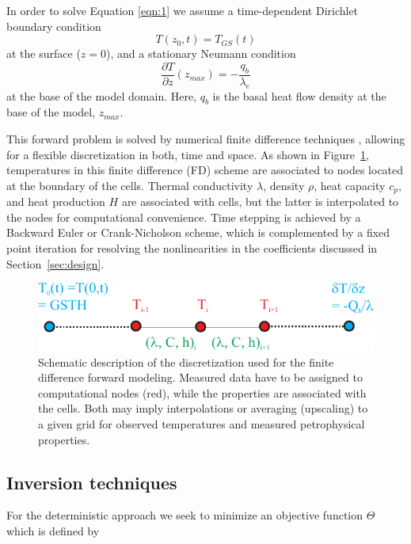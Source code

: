 \documentclass[cp]{copernicus}
\begin{document}
In order to solve Equation \ref{eqn:1} we assume a time-dependent Dirichlet boundary condition 
\begin{equation}\label{eqn:3a} 
T(z_0,t)=T_{GS}(t)
\end{equation} 
\noindent at the surface ($z=0$), and a stationary Neumann condition
\begin{equation}\label{eqn:3b}
\frac{\partial T}{\partial z}(z_{max }) = - \frac{q_b}{\lambda_e}
\end{equation} 
\noindent at the base of the model domain. Here, $q_b$ is the basal heat flow density at the base 
 of the model, $z_{max}$. 
 
This forward problem is solved by numerical finite difference techniques \cite[e.g.,][] 
{Patankar1980a}, allowing for a flexible discretization in both, time and space. As shown in 
Figure~\ref{fig:FD}, temperatures in this finite difference (FD) scheme are associated to nodes 
located at the boundary of the cells. Thermal conductivity $\lambda$, density $\rho$, heat capacity 
$c_p$, and heat production $H$ are associated with cells, but the latter is interpolated to the 
nodes for computational convenience. Time stepping is achieved by a Backward Euler or 
Crank-Nicholson scheme, which is complemented by a fixed point iteration for resolving the 
nonlinearities in the coefficients discussed in Section~\ref{sec:design}.


\begin{figure}%
 \centering
 \includegraphics[width=\columnwidth]{Figures/FDScheme}
 \caption[Schematic description of the finite difference discretization.]{Schematic description of 
the discretization used for the finite difference forward modeling. Measured data have to be 
assigned to computational nodes (red), while the properties are associated with the cells. Both may 
imply interpolations or averaging (upscaling) to a given grid for observed temperatures and 
measured 
petrophysical properties.}
\label{fig:FD}
\end{figure}

\subsection{Inversion techniques}
\label{sec:tinv}
For the deterministic approach we seek to minimize an objective function $\Theta$ which is defined 
by
\end{document}
